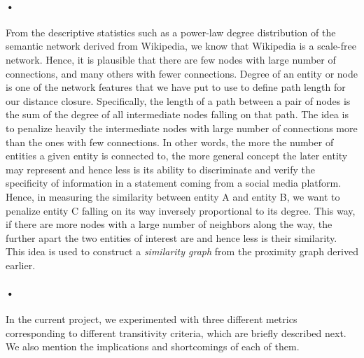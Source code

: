 \documentclass[12pt]{article}
\begin{document}
\paragraph{•}
From the descriptive statistics such as a power-law degree distribution of the semantic network derived from Wikipedia, we know that Wikipedia is a scale-free network. Hence, it is plausible that there are few nodes with large number of connections, and many others with fewer connections. Degree of an entity or node is one of the network features that we have put to use to define path length for our distance closure. Specifically, the length of a path between a pair of nodes is the sum of the degree of all intermediate nodes falling on that path. The idea is to penalize heavily the intermediate nodes with large number of connections more than the ones with few connections. In other words, the more the number of entities a given entity is connected to, the more general concept the later entity may represent and hence less is its ability to discriminate and verify the specificity of information in a statement coming from a social media platform. Hence, in measuring the similarity between entity A and entity B, we want to penalize entity C falling on its way inversely proportional to its degree. This way, if there are more nodes with a large number of neighbors along the way, the further apart the two entities of interest are and hence less is their similarity. This idea is used to construct a \textit{similarity graph} from the proximity graph derived earlier. 

\paragraph{•}
In the current project, we experimented with three different metrics corresponding to different transitivity criteria, which are briefly described next. We also mention the implications and shortcomings of each of them.
\end{document}
